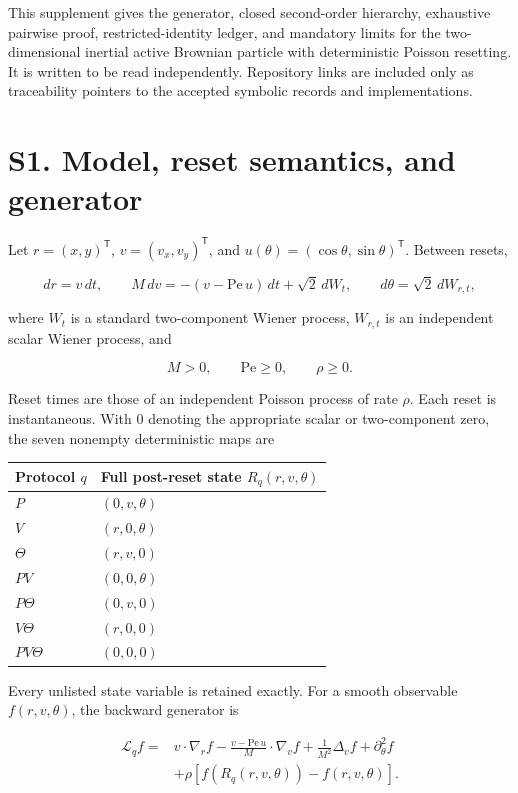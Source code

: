 This supplement gives the generator, closed second-order hierarchy, exhaustive pairwise proof, restricted-identity ledger, and mandatory limits for the two-dimensional inertial active Brownian particle with deterministic Poisson resetting. It is written to be read independently. Repository links are included only as traceability pointers to the accepted symbolic records and implementations.

\section{S1. Model, reset semantics, and generator}\label{s1.-model-reset-semantics-and-generator}

Let \(r=(x,y)^\mathsf T\), \(v=(v_x,v_y)^\mathsf T\), and \(u(\theta)=(\cos\theta,\sin\theta)^\mathsf T\). Between resets,

\[
dr=v\,dt,\qquad
M\,dv=-(v-\mathrm{Pe}\,u)\,dt+\sqrt{2}\,dW_t,\qquad
d\theta=\sqrt{2}\,dW_{r,t},
\]

where \(W_t\) is a standard two-component Wiener process, \(W_{r,t}\) is an independent scalar Wiener process, and

\[
M>0,\qquad \mathrm{Pe}\ge 0,\qquad \rho\ge 0.
\]

Reset times are those of an independent Poisson process of rate \(\rho\). Each reset is instantaneous. With \(0\) denoting the appropriate scalar or two-component zero, the seven nonempty deterministic maps are

{\def\LTcaptype{none} %
\begin{longtable}[]{@{}ll@{}}
\toprule\noalign{}
Protocol \(q\) & Full post-reset state \(R_q(r,v,\theta)\) \\
\midrule\noalign{}
\endhead
\bottomrule\noalign{}
\endlastfoot
\(P\) & \((0,v,\theta)\) \\
\(V\) & \((r,0,\theta)\) \\
\(\Theta\) & \((r,v,0)\) \\
\(PV\) & \((0,0,\theta)\) \\
\(P\Theta\) & \((0,v,0)\) \\
\(V\Theta\) & \((r,0,0)\) \\
\(PV\Theta\) & \((0,0,0)\) \\
\end{longtable}
}

Every unlisted state variable is retained exactly. For a smooth observable \(f(r,v,\theta)\), the backward generator is

\[
\boxed{
\begin{aligned}
\mathcal L_q f
={}&v\mathbin{\cdot}\nabla_r f
-\frac{v-\mathrm{Pe}\,u}{M}\mathbin{\cdot}\nabla_v f
+\frac{1}{M^2}\Delta_v f+\partial_\theta^2 f\\
&+\rho\left[f(R_q(r,v,\theta))-f(r,v,\theta)\right].
\end{aligned}}
\]

